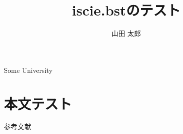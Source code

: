 \documentclass[J,amsmath]{scitrans}
\begin{document}
  \title{iscie.bstのテスト}
  \author{山田 太郎}

  \address{*}{\AcceptDate}
  \address{**}{Some University}

  \section*{本文テスト}
    参考文献\cite{azuma2008optimal,東俊一2007離散値入力型制御のための最適動的量子化器の安定性,石井貴弥2017,永原正章2017-10-06,azuma2008stability}
\end{document}
